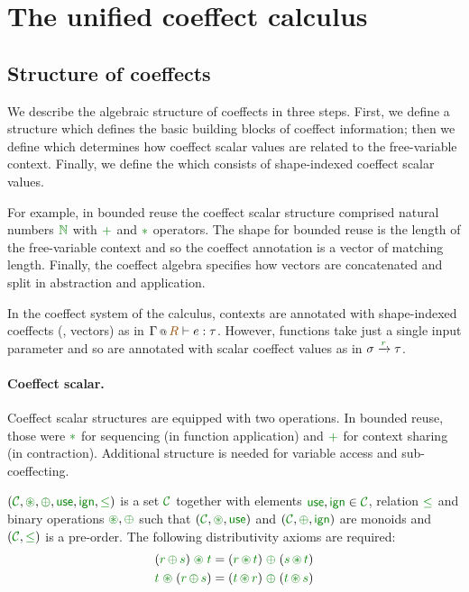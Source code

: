 \newcommand{\fcons}{ \times } 
\newcommand{\fempty}{\epsilon}


\section{The unified coeffect calculus}

\subsection{Structure of coeffects}

We describe the algebraic structure of coeffects in three
steps. First, we define a \emph{} structure 
which defines the basic building blocks of coeffect information;
then we define \emph{} which determines how
coeffect scalar values are related to the free-variable context. 
Finally, we define the \emph{} which consists of shape-indexed coeffect scalar values.

For example, in bounded reuse the coeffect scalar structure
comprised natural numbers $\cclrd{\mathbb{N}}$ with $\cclrd{+}$ and
$\cclrd{\ast}$ operators. The shape for bounded reuse is the length of the
free-variable context and so the coeffect annotation is a vector of matching length.
Finally, the coeffect algebra specifies how vectors are
concatenated and split in abstraction and application. 

In the coeffect system of the calculus, contexts are annotated with shape-indexed coeffects (\eg{}, vectors)  as in
$\coctx{\Gamma}{\aclrd{R}} \vdash e : \tau$. However, functions take just a single 
input parameter and so are annotated with scalar coeffect values as in $\sigma \xrightarrow{\cclrd{r}} \tau$.

\paragraph{Coeffect scalar.}
Coeffect scalar structures are equipped with two operations. In bounded reuse, those 
were $\cclrd{\ast}$ for sequencing (in function application) and $\cclrd{+}$ for context 
sharing (in contraction). Additional structure is needed for variable access and sub-coeffecting.

\begin{definition}
\emph{} $(\C, \cseq, \cpar, \cunit, \czero, \cleq)$ is a set $\C$
together with elements $\cunit,\czero \in \C$, relation $\cleq$ and binary operations 
$\cseq, \cpar$ such that $(\C, \cseq, \cunit)$ and $(\C, \cpar, \czero)$ are monoids
and $(\C, \cleq)$ is a pre-order. The following distributivity axioms are required:
\begin{align*}
(\cclrd{r}\, \cpar\, \cclrd{s}) \;\cseq\; \cclrd{t} & = (\cclrd{r} \,\cseq\, \cclrd{t}) \;\cpar\; (\cclrd{s}\, \cseq\, \cclrd{t}) \\
\cclrd{t} \;\cseq\; (\cclrd{r}\, \cpar\, \cclrd{s}) & = (\cclrd{t} \,\cseq\, \cclrd{r}) \;\cpar\; (\cclrd{t}\, \cseq\, \cclrd{s})
\end{align*}
\end{definition}

